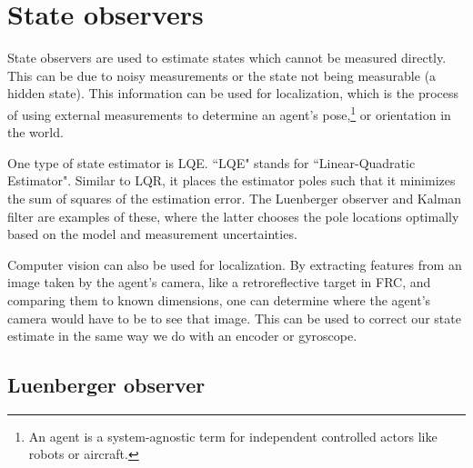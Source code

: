 \section{State observers}

State \glspl{observer} are used to estimate \glspl{state} which cannot be
measured directly. This can be due to noisy measurements or the \gls{state} not
being measurable (a hidden \gls{state}). This information can be used for
\gls{localization}, which is the process of using external measurements to
determine an \gls{agent}'s pose,\footnote{An agent is a system-agnostic term for
independent controlled actors like robots or aircraft.} or orientation in the
world.

One type of \gls{state} estimator is LQE. ``LQE" stands for ``Linear-Quadratic
Estimator". Similar to LQR, it places the estimator poles such that it minimizes
the sum of squares of the estimation \gls{error}. The Luenberger \gls{observer}
and Kalman filter are examples of these, where the latter chooses the pole
locations optimally based on the \gls{model} and measurement uncertainties.

Computer vision can also be used for \gls{localization}. By extracting features
from an image taken by the \gls{agent}'s camera, like a retroreflective target
in FRC, and comparing them to known dimensions, one can determine where the
\gls{agent}'s camera would have to be to see that image. This can be used to
correct our \gls{state} estimate in the same way we do with an encoder or
gyroscope.

\subsection{Luenberger observer}

